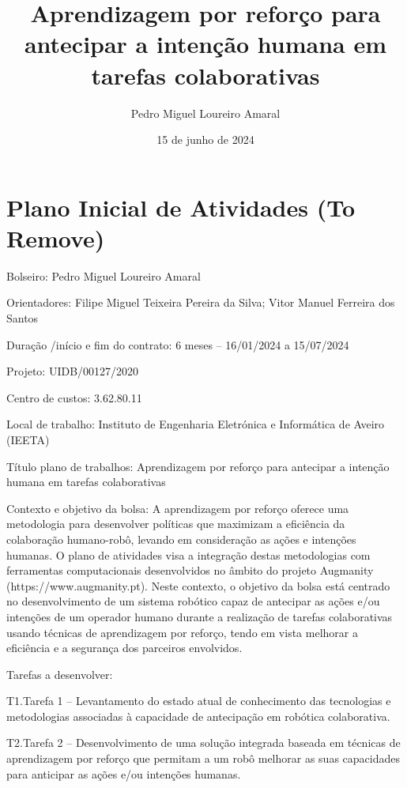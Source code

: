 \documentclass{report}
\title{Aprendizagem por reforço para antecipar a intenção humana em tarefas colaborativas}
\author{Pedro Miguel Loureiro Amaral}
\date{15 de junho de 2024}
\begin{document}
\maketitle

\renewcommand\thesection{\arabic{section}}







\color{red}

\section{Plano Inicial de Atividades (To Remove)}

Bolseiro: Pedro Miguel Loureiro Amaral

Orientadores: Filipe Miguel Teixeira Pereira da Silva; Vitor Manuel Ferreira dos Santos

Duração /início e fim do contrato: 6 meses – 16/01/2024 a 15/07/2024

Projeto: UIDB/00127/2020

Centro de custos: 3.62.80.11

Local de trabalho: Instituto de Engenharia Eletrónica e Informática de Aveiro (IEETA)

Título plano de trabalhos: Aprendizagem por reforço para antecipar a intenção humana em tarefas colaborativas

Contexto e objetivo da bolsa: A aprendizagem por reforço oferece uma metodologia para desenvolver políticas que maximizam a eficiência da colaboração humano-robô, levando em consideração as ações e intenções humanas. O plano de atividades visa a integração destas metodologias com ferramentas computacionais desenvolvidos no âmbito do projeto Augmanity (https://www.augmanity.pt). Neste contexto, o objetivo da bolsa está centrado no desenvolvimento de um sistema robótico capaz de antecipar as ações e/ou intenções de um operador humano durante a realização de tarefas colaborativas usando técnicas de aprendizagem por reforço, tendo em vista melhorar a eficiência e a segurança dos parceiros envolvidos.

Tarefas a desenvolver:

T1.Tarefa 1 – Levantamento do estado atual de conhecimento das tecnologias e metodologias associadas à capacidade de antecipação em robótica colaborativa.

T2.Tarefa 2 – Desenvolvimento de uma solução integrada baseada em técnicas de aprendizagem por reforço que permitam a um robô melhorar as suas capacidades para anticipar as ações e/ou intenções humanas.
\end{document}
